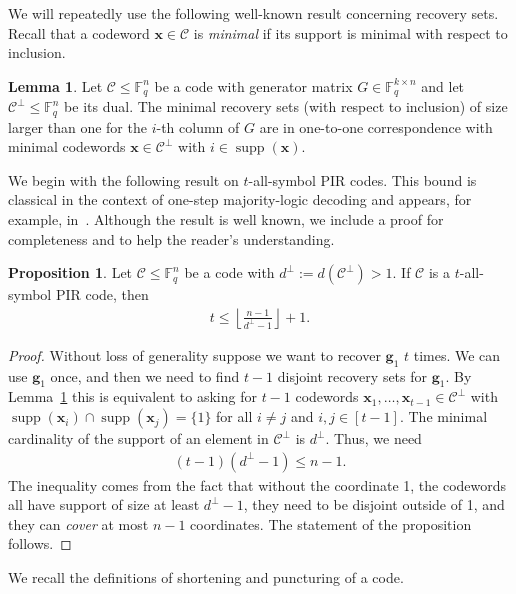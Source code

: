 \documentclass[11pt,a4paper]{article}
\theoremstyle{definition}
\newtheorem{proposition}[theorem]{Proposition}
\newtheorem{lemma}[theorem]{Lemma}
\newcommand{\bfg}{{\boldsymbol g}}
\newcommand{\bfx}{{\boldsymbol x}}
\newcommand{\F}{\mathbb{F}}
\newcommand{\mC}{\mathcal{C}}
\newcommand{\supp}{\operatorname{supp}}
\begin{document}
We will repeatedly use the following well-known result concerning recovery sets. Recall that a codeword $\bfx \in \mC$ is \textit{minimal} if its support is minimal with respect to inclusion.
\begin{lemma} \label{lem:dual}
Let $\mC \le \F_q^n$ be a code with generator matrix $G \in \F_q^{k \times n}$ and let $\mC^\perp \le \F_q^n$ be its dual. The minimal recovery sets (with respect to inclusion) of size larger than one for the $i$-th column of $G$ are in one-to-one correspondence with minimal codewords $\bfx \in \mC^\perp$ with $i \in \supp(\bfx)$.
\end{lemma}


We begin with the following result on $t$-all-symbol PIR codes. This bound is classical in the context of one-step majority-logic decoding and appears, for example, in~\cite[Theorem 8.1]{lin2001error}. Although the result is well known, we include a proof for completeness and to help the reader’s understanding. 

\begin{proposition} \label{prop:tasp}
    Let $\mC \le \F_q^n$ be a code with $d^\perp:=d(\mC^\perp) >1$. If $\mC$ is a $t$-all-symbol PIR code, then
    \begin{align*}
        t \le \left\lfloor\frac{n-1}{d^\perp-1}\right\rfloor+1.
    \end{align*}
\end{proposition}
\begin{proof}
Without loss of generality suppose we want to recover $\bfg_1$ $t$ times. We can use $\bfg_1$ once, and then we need to find $t-1$ disjoint recovery sets for $\bfg_1$. By Lemma~\ref{lem:dual} this is equivalent to asking for $t-1$ codewords $\bfx_1,\dots, \bfx_{t-1} \in \mC^\perp$ with $\supp(\bfx_i) \cap \supp(\bfx_j) = \{1\}$ for all $i \ne j$ and $i,j \in [t-1]$. The minimal cardinality of the support of an element in $\mC^\perp$ is $d^\perp$. Thus, we need
\begin{align*}
    (t-1)(d^\perp-1) \le n-1.
\end{align*}
The inequality comes from the fact that without the coordinate 1, the codewords all have support of size at least $d^\perp-1$, they need to be disjoint outside of 1, and they can \emph{cover} at most $n-1$ coordinates. The statement of the proposition follows.
\end{proof}


We recall the definitions of shortening and puncturing of a code.
\end{document}
